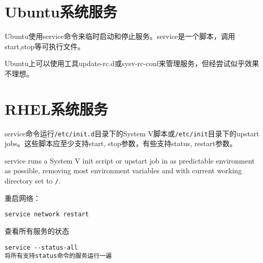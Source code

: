 
\section{Ubuntu系统服务}

Ubuntu使用service命令来临时启动和停止服务。service是一个脚本，调用start,stop等可执行文件。

Ubuntu上可以使用工具update-rc.d或sysv-rc-conf来管理服务，但经尝试似乎效果不理想。


\section{RHEL系统服务}
service命令运行\verb+/etc/init.d+目录下的System V脚本或\verb+/etc/init+目录下的upstart jobs。这些脚本应至少支持start, stop参数，有些支持status, restart参数。

service runs a System V init script or upstart job in as predictable environment as possible, removing most environment variables and with current working directory set to \verb+/+.  

重启网络：
\begin{verbatim}
service network restart
\end{verbatim}

查看所有服务的状态
\begin{verbatim}
service --status-all
将所有支持status命令的服务运行一遍
\end{verbatim}

